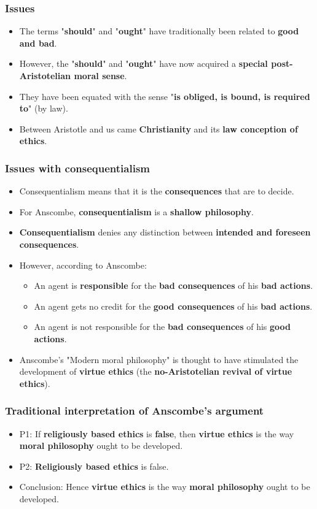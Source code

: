 \documentclass[11pt]{article}
\begin{document}
\subsubsection{Issues}
\label{sec:org6568286}
\begin{itemize}
\item The terms "\textbf{should}" and "\textbf{ought}" have traditionally been related to \textbf{good and bad}.
\item However, the "\textbf{should}" and "\textbf{ought}" have now acquired a \textbf{special post-Aristotelian moral sense}.
\item They have been equated with the sense "\textbf{is obliged, is bound, is required to}" (by law).
\item Between Aristotle and us came \textbf{Christianity} and its \textbf{law conception of ethics}.
\end{itemize}

 \newpage
\subsubsection{Issues with consequentialism}
\label{sec:orgbe61c31}
\begin{itemize}
\item Consequentialism means that it is the \textbf{consequences} that are to decide.
\item For Anscombe, \textbf{consequentialism} is a \textbf{shallow philosophy}.
\item \textbf{Consequentialism} denies any distinction between \textbf{intended and foreseen consequences}.
\item However, according to Anscombe:
\begin{itemize}
\item An agent is \textbf{responsible} for the \textbf{bad consequences} of his \textbf{bad actions}.
\item An agent gets no credit for the \textbf{good consequences} of his \textbf{bad actions}.
\item An agent is not responsible for the \textbf{bad consequences} of his \textbf{good actions}.
\end{itemize}
\item Anscombe's "Modern moral philosophy" is thought to have stimulated the development of \textbf{virtue ethics} (the \textbf{no-Aristotelian revival of virtue ethics}).
\end{itemize}
\subsubsection{Traditional interpretation of Anscombe's argument}
\label{sec:org57ff975}
\begin{itemize}
\item P1: If \textbf{religiously based ethics} is \textbf{false}, then \textbf{virtue ethics} is the way \textbf{moral philosophy} ought to be developed.
\item P2: \textbf{Religiously based ethics} is false.
\item Conclusion: Hence \textbf{virtue ethics} is the way \textbf{moral philosophy} ought to be developed.
\end{itemize}
\end{document}
